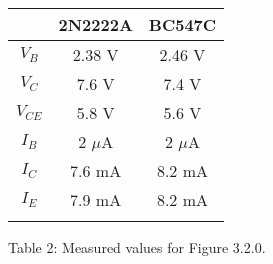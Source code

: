 {\bfseries\itshape\color{carmine}{Observation:}} {\itshape{}} \hfill \break

\begin{center}
\begin{tabular}[1.5cm]{c c c}
\toprule
\toprule
\centering \hspace{120pt} & \hspace{50pt} {\bfseries 2N2222A} \hspace{50pt}  & \hspace{50pt} {\bfseries BC547C} \hspace{50pt} \\
\midrule
\midrule
$V_{B}$ & 2.38 V & 2.46 V \\
\cmidrule{1-3}
$V_{C}$ & 7.6 V & 7.4 V \\
\cmidrule{1-3}
$V_{CE}$ & 5.8 V & 5.6 V \\
\cmidrule{1-3}
$I_{B}$ & 2 $\mu$A & 2 $\mu$A \\
\cmidrule{1-3}
$I_{C}$ & 7.6 mA & 8.2 mA \\
\cmidrule{1-3}
$I_{E}$ & 7.9 mA & 8.2 mA \\
\bottomrule
\linebreak
\end{tabular}
\linebreak Table 2: Measured values for Figure 3.2.0.
\end{center}

\pagebreak